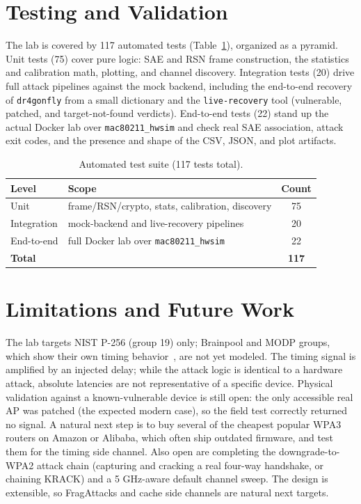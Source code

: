 \documentclass[11pt,letterpaper]{article}
\newcommand{\code}[1]{\texttt{\small #1}}
\begin{document}
\section{Testing and Validation}
The lab is covered by 117 automated tests (Table~\ref{tab:tests}), organized as a
pyramid. Unit tests (75) cover pure logic: SAE and RSN frame construction, the
statistics and calibration math, plotting, and channel discovery. Integration
tests (20) drive full attack pipelines against the mock backend, including the
end-to-end recovery of \code{dr4gonfly} from a small dictionary and the
\code{live-recovery} tool (vulnerable, patched, and target-not-found verdicts). End-to-end tests (22) stand up the actual Docker lab over
\code{mac80211\_hwsim} and check real SAE association, attack exit codes, and the
presence and shape of the CSV, JSON, and plot artifacts.

\begin{table}[ht]
  \centering
  \caption{Automated test suite (117 tests total).}
  \label{tab:tests}
  \begin{tabular}{llc}
    \toprule
    Level & Scope & Count \\
    \midrule
    Unit        & frame/RSN/crypto, stats, calibration, discovery & 75 \\
    Integration & mock-backend and live-recovery pipelines         & 20 \\
    End-to-end  & full Docker lab over \code{mac80211\_hwsim}      & 22 \\
    \midrule
    \multicolumn{2}{l}{\textbf{Total}} & \textbf{117} \\
    \bottomrule
  \end{tabular}
\end{table}

\section{Limitations and Future Work}
\label{sec:future}
The lab targets NIST P-256 (group 19) only; Brainpool and MODP groups, which show
their own timing behavior~\cite{cve_2019_13377}, are not yet modeled. The timing
signal is amplified by an injected delay; while the attack logic is identical to
a hardware attack, absolute latencies are not representative of a specific device.
Physical validation against a known-vulnerable device is still open: the only
accessible real AP was patched (the expected modern case), so the field test
correctly returned no signal. A natural next step is to buy several of the
cheapest popular WPA3 routers on Amazon or Alibaba, which often ship outdated
firmware, and test them for the timing side channel. Also open are completing the
downgrade-to-WPA2 attack chain (capturing and cracking a real four-way handshake,
or chaining KRACK) and a 5 GHz-aware default channel sweep. The design is
extensible, so FragAttacks and cache side channels are natural next targets.
\end{document}
